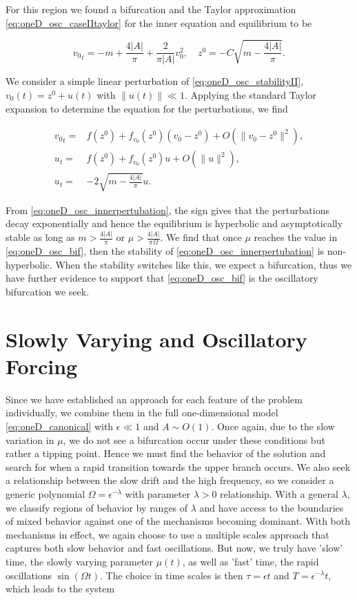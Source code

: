 For this region we found a bifurcation and the Taylor approximation \eqref{eq:oneD_osc_caseIItaylor} for the inner equation and equilibrium to be

\begin{equation}\label{eq:oneD_osc_stabilityII}
{v_0}_t= -m +\frac{4|A|}{\pi}+\frac{2}{\pi |A|}v_0^2,\quad z^0=-C \sqrt{m-\frac{4|A|}{\pi}}.
\end{equation}

We consider a simple linear perturbation of \eqref{eq:oneD_osc_stabilityII}, $v_0(t)=z^0+u(t)$ with $\lVert u(t) \rVert \ll 1$. Applying the standard Taylor expansion to determine the equation for the perturbations, we find

\begin{equation}\label{eq:oneD_osc_innerpertubation}
\begin{aligned}
{v_0}_t =& f(z^0)+f_{v_0}(z^0)(v_0-z^0)+ O(\lVert v_0-z^0\rVert^2),\\ 
u_t =& f(z^0)+f_{v_0}(z^0)u+O(\lVert u \rVert^2),\\
u_t =& -2\sqrt{m-\frac{4|A|}{\pi}} u .
\end{aligned}
\end{equation}

From \eqref{eq:oneD_osc_innerpertubation}, the sign gives that the perturbations decay exponentially and hence the equilibrium is hyperbolic and asymptotically stable as long as $m>\frac{4|A|}{\pi}$ or $\mu>\frac{4|A|}{\pi \Omega}$. We find that once $\mu$ reaches the value in \eqref{eq:oneD_osc_bif}, then the stability of \eqref{eq:oneD_osc_innerpertubation} is non-hyperbolic. When the stability switches like this, we expect a bifurcation, thus we have further evidence to support that \eqref{eq:oneD_osc_bif} is the oscillatory bifurcation we seek.

\section{Slowly Varying and Oscillatory Forcing}
\label{sec:oneD_slowosc}

Since we have established an approach for each feature of the problem individually, we combine them in the full one-dimensional model \eqref{eq:oneD_canonical} with $\epsilon\ll 1$ and ${A\sim O(1)}$. Once again, due to the slow variation in $\mu$, we do not see a bifurcation occur under these conditions but rather a tipping point. Hence we must find the behavior of the solution and search for when a rapid transition towards the upper branch occurs. We also seek a relationship between the slow drift and the high frequency, so we consider a generic polynomial $\Omega = \epsilon^{-\lambda}$ with parameter $\lambda>0$ relationship. With a general $\lambda$, we classify regions of behavior by ranges of $\lambda$ and have access to the boundaries of mixed behavior against one of the mechanisms becoming dominant. With both mechanisms in effect, we again choose to use a multiple scales approach that captures both slow behavior and fast oscillations. But now, we truly have 'slow' time, the slowly varying parameter $\mu(t)$, as well as 'fast' time, the rapid oscillations $\sin(\Omega t)$. The choice in time scales is then $\tau=\epsilon t$ and $T=\epsilon^{-\lambda} t$, which leads to the system

